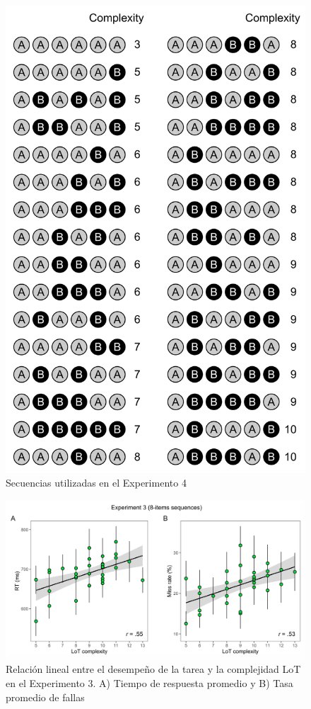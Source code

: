 \begin{figure}[t!]
      \includegraphics[scale=0.8]{figuras/plosbio/journal.pcbi.1008598.s004.png}
      \centering
      \caption{Secuencias utilizadas en el Experimento 4}
      \label{PlosBIO-S4}
\end{figure}

\begin{figure}[t!]
      \includegraphics[scale=0.8]{figuras/plosbio/journal.pcbi.1008598.s005.png}
      \centering
      \caption{Relación lineal entre el desempeño de la tarea y la complejidad LoT en el Experimento 3. A) Tiempo de respuesta promedio y B) Tasa promedio de fallas}
      \label{PlosBIO-S5}
\end{figure}

